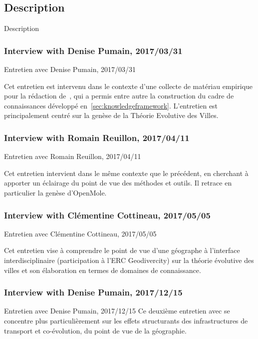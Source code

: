 \subsection{Description}{Description}

\subsubsection{Interview with Denise Pumain, 2017/03/31}{Entretien avec Denise Pumain, 2017/03/31}

Cet entretien est intervenu dans le contexte d'une collecte de matériau empirique pour la rédaction de~\cite{raimbault2017applied}, qui a permis entre autre la construction du cadre de connaissances développé en~\ref{sec:knowledgeframework}. L'entretien est principalement centré sur la genèse de la Théorie Evolutive des Villes.

\subsubsection{Interview with Romain Reuillon, 2017/04/11}{Entretien avec Romain Reuillon, 2017/04/11}

Cet entretien intervient dans le même contexte que le précédent, en cherchant à apporter un éclairage du point de vue des méthodes et outils. Il retrace en particulier la genèse d'OpenMole.

\subsubsection{Interview with Clémentine Cottineau, 2017/05/05}{Entretien avec Clémentine Cottineau, 2017/05/05}

Cet entretien vise à comprendre le point de vue d'une géographe à l'interface interdisciplinaire (participation à l'ERC Geodivercity) sur la théorie évolutive des villes et son élaboration en termes de domaines de connaissance.




\subsubsection{Interview with Denise Pumain, 2017/12/15}{Entretien avec Denise Pumain, 2017/12/15}
Ce deuxième entretien avec  se concentre plus particulièrement sur les effets structurants des infrastructures de transport et co-évolution, du point de vue de la géographie.




